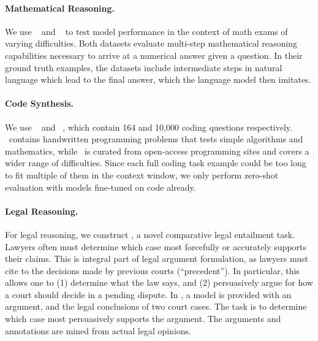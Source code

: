 \paragraph{Mathematical Reasoning.} 
We use \gsm~\citep{cobbe2020leveraging} and \MATH~\citep{hendrycks2021measuring} to test model performance in the context of math exams of varying difficulties. Both datasets evaluate multi-step mathematical reasoning capabilities necessary to arrive at a numerical answer given a question. In their ground truth examples, the datasets include intermediate steps in natural language which lead to the final answer, which the language model then imitates. 

\paragraph{Code Synthesis.} 
We use \humaneval~\citep{chen2021codex} and \codeapps~\citep{hendrycks2021measuringcoding}, which contain 164 and 10,000 coding questions respectively.
\humaneval~contains handwritten programming problems that tests simple algorithms and mathematics, while \codeapps~is curated from open-access programming sites and covers a wider range of difficulties.  
Since each full coding task example could be too long to fit multiple of them in the context window, we only perform zero-shot evaluation with models fine-tuned on code already. 

\paragraph{Legal Reasoning.} 
For legal reasoning, we construct \legalsupport, a novel comparative legal entailment task. 
Lawyers often must determine which case most forcefully or accurately supports their claims. 
This is integral part of legal argument formulation, as lawyers must cite to the decisions made by previous courts (\ie ``precedent'').
In particular, this allows one to (1) determine what the law says, and (2) persuasively argue for how a court should decide in a pending dispute. 
In \legalsupport, a model is provided with an argument, and the legal conclusions of two court cases. 
The task is to determine which case most persuasively supports the argument. 
The arguments and annotations are mined from actual legal opinions. 

